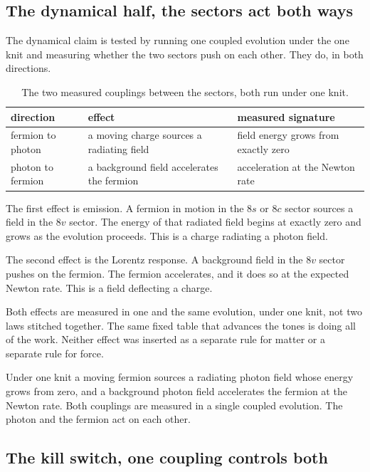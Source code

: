 \subsection{The dynamical half, the sectors act both ways}

The dynamical claim is tested by running one coupled evolution under the one knit and measuring whether the two sectors push on each other. They do, in both directions.

\begin{table}[ht]
\centering
\begin{tabular}{@{}lll@{}}
\toprule
direction & effect & measured signature \\
\midrule
fermion to photon & a moving charge sources a radiating field & field energy grows from exactly zero \\
photon to fermion & a background field accelerates the fermion & acceleration at the Newton rate \\
\bottomrule
\end{tabular}
\caption{The two measured couplings between the sectors, both run under one knit.}
\label{tab:co-emergence-directions}
\end{table}

The first effect is emission. A fermion in motion in the $8s$ or $8c$ sector sources a field in the $8v$ sector. The energy of that radiated field begins at exactly zero and grows as the evolution proceeds. This is a charge radiating a photon field.

The second effect is the Lorentz response. A background field in the $8v$ sector pushes on the fermion. The fermion accelerates, and it does so at the expected Newton rate. This is a field deflecting a charge.

Both effects are measured in one and the same evolution, under one knit, not two laws stitched together. The same fixed table that advances the tones is doing all of the work. Neither effect was inserted as a separate rule for matter or a separate rule for force.

\begin{result}
Under one knit a moving fermion sources a radiating photon field whose energy grows from zero, and a background photon field accelerates the fermion at the Newton rate. Both couplings are measured in a single coupled evolution. The photon and the fermion act on each other.
\end{result}

\subsection{The kill switch, one coupling controls both}


